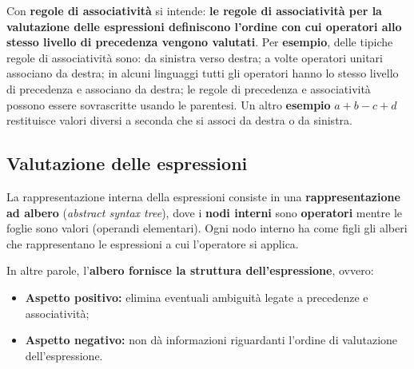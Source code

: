 \documentclass[a4paper]{article}
\begin{document}
	\noindent
	Con \textcolor{Red3}{\textbf{regole di associatività}} si intende: \textbf{le regole di associatività per la valutazione delle espressioni definiscono l'ordine con cui operatori allo stesso livello di precedenza vengono valutati}. Per \textcolor{Green4}{\textbf{esempio}}, delle tipiche regole di associatività sono: da sinistra verso destra; a volte operatori unitari associano da destra; in alcuni linguaggi tutti gli operatori hanno lo stesso livello di precedenza e associano da destra; le regole di precedenza e associatività possono essere sovrascritte usando le parentesi.\newline
	Un altro \textcolor{Green4}{\textbf{esempio}} $a+b-c+d$ restituisce valori diversi a seconda che si associ da destra o da sinistra.\newpage
	
	\subsection{Valutazione delle espressioni}\label{valutazione delle espressioni}
	
	La rappresentazione interna della espressioni consiste in una \textbf{rappresentazione ad albero} (\emph{abstract syntax tree}), dove i \textbf{nodi interni} sono \textbf{operatori} mentre le foglie sono valori (operandi elementari). Ogni nodo interno ha come figli gli alberi che rappresentano le espressioni a cui l'operatore si applica.\newline
	
	\noindent
	In altre parole, l'\textbf{albero fornisce la struttura dell'espressione}, ovvero:
	\begin{itemize}
		\item \textcolor{Green4}{\textbf{Aspetto positivo:}} elimina eventuali ambiguità legate a precedenze e associatività;
		\item \textcolor{Red3}{\textbf{Aspetto negativo:}} non dà informazioni riguardanti l'ordine di valutazione dell'espressione.
	\end{itemize}
	
\end{document}
